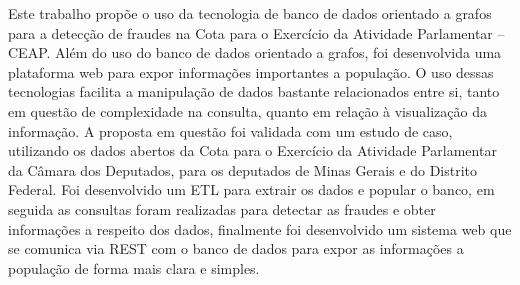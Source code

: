 	Este trabalho propõe o uso da tecnologia de banco de dados orientado a grafos para a detecção de fraudes na Cota para o Exercício da Atividade Parlamentar – CEAP. Além do uso do banco de dados orientado a grafos, foi desenvolvida uma plataforma web para expor informações importantes a população. O uso dessas tecnologias facilita a manipulação de dados bastante relacionados entre si, tanto em questão de complexidade na consulta, quanto em relação à visualização da informação. A proposta em questão foi validada com um estudo de caso, utilizando os dados abertos da Cota para o Exercício da Atividade Parlamentar da Câmara dos Deputados, para os deputados de Minas Gerais e do Distrito Federal. Foi desenvolvido um ETL para extrair os dados e popular o banco, em seguida as consultas foram realizadas para detectar as fraudes e obter informações a respeito dos dados, finalmente foi desenvolvido um sistema web que se comunica via REST com o banco de dados para expor as informações a população de forma mais clara e simples.